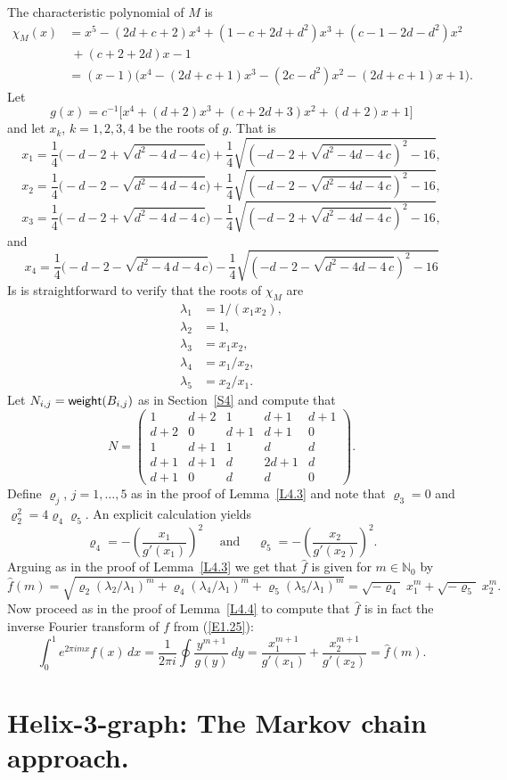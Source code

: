 \documentclass[11pt]{article}
\providecommand{\1}{\mathBB{1}}
\newcommand{\mbu}{\quad\mbox{ and }\quad}
\newcommand{\N}{{\mathbb{N}}}
\def\hatf{\widehat f}
\newcommand{\equ}[1]{(\ref{#1})}
\newcommand{\Section}[1]{\section{#1}\setcounter{figure}{0}\setcounter{table}{0}\setcounter{equation}{0}}
\newcommand{\weight}{\mathop{\mbox{\sf weight}}}
\begin{document}
The characteristic polynomial of $M$ is
\begin{equation}
\label{E5.02}
\begin{aligned}
\chi_M(x)&=x^5-(2d+c+2)x^4+(1-c+2d+d^2)x^3+(c-1-2d-d^2)x^2\\&\ +(c+2+2d)x-1\\
&=(x-1)\big(x^4-(2d+c+1)x^3-(2c-d^2)x^2-(2d+c+1)x+1\big).
\end{aligned}
\end{equation}
Let $$g(x)=c^{-1}\big[x^4+(d+2)x^3+(c+2d+3)x^2+(d+2)x+1]$$
and let $x_k$, $k=1,2,3,4$ be the roots of $g$. That is
$$x_{1}=\frac{1}{4}\big(-d-2+\sqrt {{d}^{2}-4\,d-4\,c}\big)+\frac14\sqrt { \left( -d
-2+\sqrt {{d}^{2}-4d-4\,c} \right) ^{2}-16},
$$
$$x_{2}=\frac{1}{4}\big(-d-2-\sqrt {{d}^{2}-4\,d-4\,c}\big)+\frac14\sqrt { \left( -d
-2-\sqrt {{d}^{2}-4d-4\,c} \right) ^{2}-16},
$$
$$x_{3}=\frac{1}{4}\big(-d-2+\sqrt {{d}^{2}-4\,d-4\,c}\big)-\frac14\sqrt { \left( -d
-2+\sqrt {{d}^{2}-4d-4\,c} \right) ^{2}-16},
$$
and
$$x_{4}=\frac{1}{4}\big(-d-2-\sqrt {{d}^{2}-4\,d-4\,c}\big)-\frac14\sqrt { \left( -d
-2-\sqrt {{d}^{2}-4d-4\,c} \right) ^{2}-16}
$$
Is is straightforward to verify that the roots of $\chi_M$ are
\begin{equation}
\label{E5.03}
\begin{aligned}
\lambda_1&=1/(x_1x_2),\\
\lambda_2&=1,\\
\lambda_3&=x_1x_2,\\
\lambda_4&=x_1/x_2,\\
\lambda_5&=x_2/x_1.
\end{aligned}
\end{equation}
Let $N_{i,j}=\weight(B_{i,j})$ as in Section~\ref{S4} and compute that
\begin{equation}
\label{E5.04}
N=\left(\begin{array}{ccccc}
1&d+2&1&d+1&d+1\\
d+2&0&d+1&d+1&0\\
1&d+1&1&d&d\\
d+1&d+1&d&2d+1&d\\
d+1&0&d&d&0
\end{array}\right)
.
\end{equation}
Define $\varrho_j$, $j=1,\ldots,5$ as in the proof of Lemma~\ref{L4.3} and note that $\varrho_3=0$ and $\varrho_2^2=4\varrho_4\varrho_5$. An explicit calculation yields
$$\varrho_4=-\left(\frac{x_1}{g'(x_1)}\right)^2\mbu\varrho_5=-\left(\frac{x_2}{g'(x_2)}\right)^2.$$
 Arguing as in the proof of Lemma~\ref{L4.3} we get that $\hatf$ is given for $m\in\N_0$ by
$$\hatf(m)=\sqrt{\varrho_2(\lambda_2/\lambda_1)^m+\varrho_4(\lambda_4/\lambda_1)^m+\varrho_5(\lambda_5/\lambda_1)^m}=\sqrt{-\varrho_4}\;x_1^m+\sqrt{-\varrho_5}\;x_2^m.$$
Now proceed as in the proof of Lemma~\ref{L4.4} to compute that $\hatf$ is in fact the inverse Fourier transform of $f$ from \equ{E1.25}:
$$\int_0^1e^{2\pi imx}f(x)\,dx=\frac{1}{2\pi i}\oint\frac{y^{m+1}}{g(y)}\,dy
=\frac{x_1^{m+1}}{g'(x_1)}+\frac{x_2^{m+1}}{g'(x_2)}=\hatf(m).
$$
\Section{Helix-3-graph: The Markov chain approach.}
\label{S6}
\end{document}
